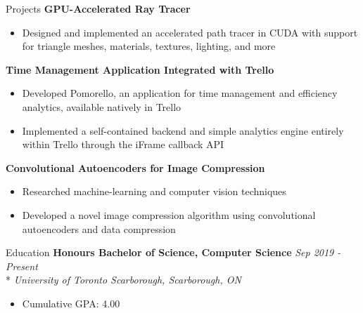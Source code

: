 \documentclass[11pt, letterpaper]{article}
\begin{document}
\begin{section}{Projects}
\textbf{GPU-Accelerated Ray Tracer}
\begin{itemize}
  \item Designed and implemented an accelerated path tracer in CUDA with support for triangle meshes, materials, textures, lighting, and more\\
\end{itemize}

\textbf{Time Management Application Integrated with Trello}
\begin{itemize}
  \item Developed Pomorello, an application for time management and efficiency analytics, available natively in Trello
  \item Implemented a self-contained backend and simple analytics engine entirely within Trello through the iFrame callback API\\
\end{itemize}

\textbf{Convolutional Autoencoders for Image Compression}
\begin{itemize}
  \item Researched machine-learning and computer vision techniques
  \item Developed a novel image compression algorithm using convolutional autoencoders and data compression
\end{itemize}

\end{section}

\begin{section}{Education}
\textbf{Honours Bachelor of Science, Computer Science}
\hfill
\textit{Sep 2019 - Present}\\*
\textit{University of Toronto Scarborough, Scarborough, ON}
\begin{itemize}
  \item Cumulative GPA: 4.00
\end{itemize}

\end{section}
\end{document}
